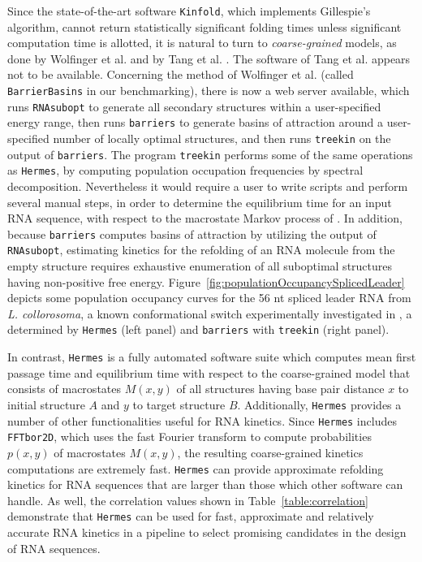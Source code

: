 Since the state-of-the-art software {\tt Kinfold}, which implements
Gillespie's algorithm, cannot return statistically significant folding
times unless significant computation time is allotted, it is natural
to turn to {\em coarse-grained} models, as done by
Wolfinger et al. \cite{wolfingerStadler:kinetics} and by
Tang et al. \cite{Tang.jmb08}.  The software of Tang et al. appears not
to be available. Concerning the
method of Wolfinger et al. (called {\tt BarrierBasins} in our benchmarking),
there is now a web server available, which runs {\tt RNAsubopt}
\cite{Wuchty.b99} to generate all secondary structures within a user-specified
energy range, then runs {\tt barriers} \cite{flammHofacker} to generate
basins of attraction around a user-specified number of locally optimal
structures, and then runs {\tt treekin} on the output of {\tt barriers}.
The program {\tt treekin} performs some of the same operations as {\tt Hermes},
by computing population occupation frequencies by spectral decomposition.
Nevertheless it would require a user to write scripts and perform
several manual steps, in order to determine the equilibrium time for
an input RNA sequence, with respect to the macrostate Markov process
of \cite{wolfingerStadler:kinetics}. In addition, because {\tt barriers} computes
basins of attraction by utilizing the output of {\tt RNAsubopt}, estimating kinetics for the
refolding of an RNA molecule from the empty structure requires exhaustive enumeration
of all suboptimal structures having non-positive free energy.
Figure~\ref{fig:populationOccupancySplicedLeader} depicts some population
occupancy curves for the 56 nt spliced leader RNA from
{\em L. collorosoma}, a known conformational switch experimentally
investigated in \cite{lecuyerCrothers}, a determined by
{\tt Hermes} (left panel) and {\tt barriers} with {\tt treekin}
(right panel).

In contrast, {\tt Hermes} is a fully automated software suite which
computes mean first passage time and equilibrium time with respect to
the coarse-grained model that consists of macrostates $M(x,y)$ of all
structures having base pair distance $x$ to initial structure $A$ and
$y$ to target structure $B$. Additionally, {\tt Hermes} provides
a number of other functionalities useful for RNA kinetics. Since
{\tt Hermes} includes {\tt FFTbor2D}, which uses the fast Fourier transform
to compute probabilities $p(x,y)$ of macrostates $M(x,y)$, the resulting
coarse-grained kinetics computations are extremely fast. {\tt Hermes}
can provide approximate refolding kinetics for RNA sequences that are
larger than those which other software can handle. As well, the
correlation values shown in Table~\ref{table:correlation}
demonstrate that {\tt Hermes} can be used for fast, approximate and relatively
accurate RNA kinetics in a pipeline to select promising candidates in
the design of RNA sequences.


